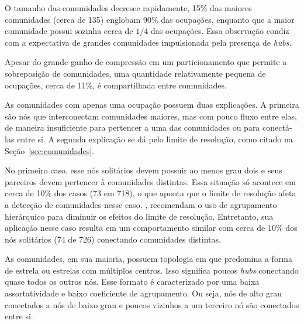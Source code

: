 \documentclass[
  article,
  11pt,
  a4paper,
  english,
  brazil,
  sumario=tradicional]{abntex2}
\begin{document}
O tamanho das comunidades decresce rapidamente, 15\% das maiores comunidades (cerca de 135) englobam 90\% das ocupações, enquanto que a maior comunidade possui sozinha cerca de $1/4$ das ocupações. Essa observação condiz com a expectativa de grandes comunidades impulsionada pela presença de \textit{hubs}.

Apesar do grande ganho de compressão em um particionamento que permite a sobreposição de comunidades, uma quantidade relativamente pequena de ocupações, cerca de 11\%, é compartilhada entre comunidades.

As comunidades com apenas uma ocupação possuem duas explicações. A primeira são nós que interconectam comunidades maiores, mas com pouco fluxo entre elas, de maneira insuficiente para pertencer a uma das comunidades ou para conectá-las entre si. A segunda explicação se dá pelo limite de resolução, como citado na Seção~\ref{sec:comunidades}.

No primeiro caso, esse nós solitários devem possuir ao menos grau dois e seus parceiros devem pertencer à comunidades distintas. Essa situação só acontece em cerca de 10\% dos casos (73 em 718), o que aponta que o limite de resolução afeta a detecção de comunidades nesse caso. , recomendam o uso de agrupamento hierárquico para diminuir os efeitos do limite de resolução. Entretanto, sua aplicação nesse caso resulta em um comportamento similar com cerca de 10\% dos nós solitários (74 de 726) conectando comunidades distintas.

As comunidades, em sua maioria, possuem topologia em que predomina a forma de estrela ou estrelas com múltiplos centros. Isso significa poucos \textit{hubs} conectando quase todos os outros nós. Esse formato é caracterizado por uma baixa assortatividade e baixo coeficiente de agrupamento. Ou seja, nós de alto grau conectados a nós de baixo grau e poucos vizinhos a um terceiro nó são conectados entre si.
\end{document}
